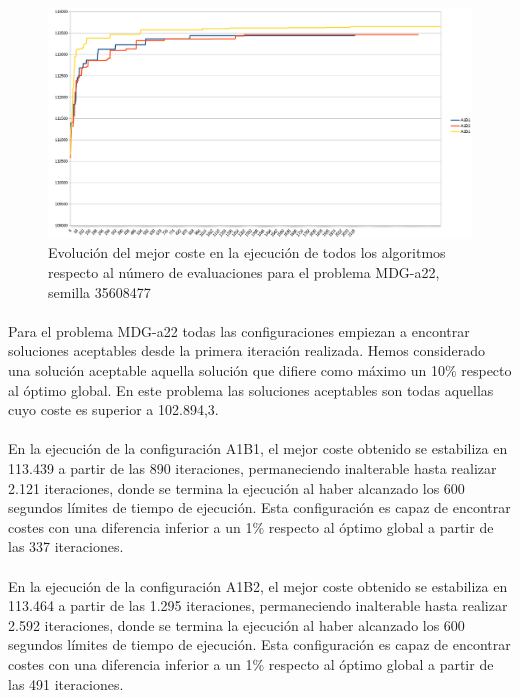 	\begin{figure}[H]
		\centering
		\includegraphics[scale=0.3]{img/MDG2conver.png}
		\caption{Evolución del mejor coste en la ejecución de todos los algoritmos respecto al número de evaluaciones para el problema MDG-a22, semilla 35608477}
		\label{MDG-a_22_historico}
	\end{figure}

	\paragraph{}Para el problema MDG-a22 todas las configuraciones empiezan a encontrar soluciones aceptables desde la primera iteración realizada. Hemos considerado una solución aceptable aquella solución que difiere como máximo un 10\% respecto al óptimo global. En este problema las soluciones aceptables son todas aquellas cuyo coste es superior a 102.894,3.
	
	\paragraph{}En la ejecución de la configuración A1B1, el mejor coste obtenido se estabiliza en 113.439 a partir de las 890 iteraciones, permaneciendo inalterable hasta realizar 2.121 iteraciones, donde se termina la ejecución al haber alcanzado los 600 segundos límites de tiempo de ejecución. Esta configuración es capaz de encontrar costes con una diferencia inferior a un 1\% respecto al óptimo global a partir de las 337 iteraciones.
	
	\paragraph{}En la ejecución de la configuración A1B2, el mejor coste obtenido se estabiliza en 113.464 a partir de las 1.295 iteraciones, permaneciendo inalterable hasta realizar 2.592 iteraciones, donde se termina la ejecución al haber alcanzado los 600 segundos límites de tiempo de ejecución. Esta configuración es capaz de encontrar costes con una diferencia inferior a un 1\% respecto al óptimo global a partir de las 491 iteraciones.
	
